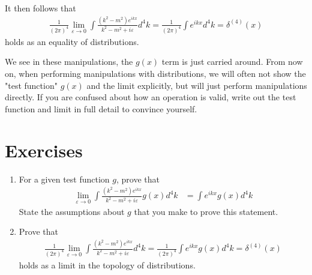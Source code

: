 \documentclass[book.tex]{subfiles}
\begin{document}
It then follows that
\begin{align}
\frac{1}{(2\pi)^4} \lim_{\varepsilon \to 0} \int \frac{(k^2-m^2) e^{ikx}}{k^2-m^2+i\varepsilon} d^4 k = \frac{1}{(2\pi)^4} \int e^{ikx} d^4 k = \delta^{(4)}(x)
\end{align}
holds as an equality of distributions.

We see in these manipulations, the $g(x)$ term is just carried around. From now on, when performing manipulations with distributions, we will often not show the "test function" $g(x)$ and the limit explicitly, but will just perform manipulations directly. If you are confused about how an operation is valid, write out the test function and limit in full detail to convince yourself.

\section{Exercises}
\begin{enumerate}
    \item For a given test function $g$, prove that
    \begin{align}
    \lim_{\varepsilon \to 0} \int \frac{(k^2-m^2)e^{ikx}}{k^2-m^2+i\varepsilon} g(x) d^4k &= \int e^{ikx} g(x) d^4k
    \end{align}
    State the assumptions about $g$ that you make to prove this statement.
    \item Prove that \begin{align}
    \frac{1}{(2\pi)^4} \lim_{\varepsilon \to 0} \int \frac{(k^2-m^2) e^{ikx}}{k^2-m^2+i\varepsilon} d^4 k = \frac{1}{(2\pi)^4} \int e^{ikx} g(x) d^4 k = \delta^{(4)}(x)
    \end{align}
    holds as a limit in the topology of distributions.
\end{enumerate}
\end{document}
